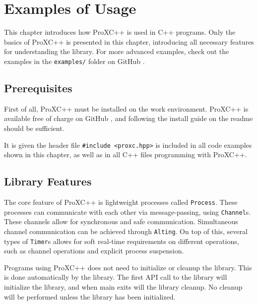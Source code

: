 

\chapter{Examples of Usage}
\label{ch:examples_usage}

This chapter introduces how ProXC++ is used in C++ programs. Only the basics of ProXC++ is presented in this chapter, introducing all necessary features for understanding the library. For more advanced examples, check out the examples in the \texttt{examples/} folder on GitHub \citep{pettersen2017proxcgithub}.


\section{Prerequisites}
\label{sec:example_prerequisites}

First of all, ProXC++ must be installed on the work environment. ProXC++ is available free of charge on GitHub \citep{pettersen2017proxcgithub}, and following the install guide on the readme should be sufficient.

It is given the header file \lstinline[style={CustomC++}]|#include <proxc.hpp>| is included in all code examples shown in this chapter, as well as in all C++ files programming with ProXC++.


\section{Library Features}
\label{sec:example_library_features}

The core feature of ProXC++ is lightweight processes called \texttt{Process}. These processes can communicate with each other via message\hyp{}passing, using \texttt{Channel}s. These channels allow for synchronous and safe communication. Simultaneous channel communication can be achieved through \texttt{Alting}. On top of this, several types of \texttt{Timer}s allows for soft real\hyp{}time requirements on different operations, such as channel operations and explicit process suspension.

Programs using ProXC++ does not need to initialize or cleanup the library. This is done automatically by the library. The first API call to the library will initialize the library, and when main exits will the library cleanup. No cleanup will be performed unless the library has been initialized. 


